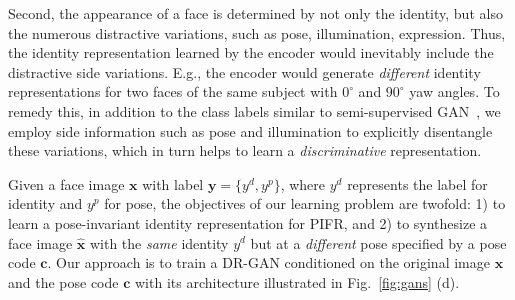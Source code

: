 \documentclass[10pt,journal,compsoc]{IEEEtran}
\begin{document}
Second, the appearance of a face is determined by not only the identity, but also the numerous distractive variations, such as pose, illumination, expression.
Thus, the identity representation learned by the encoder would inevitably include the distractive side variations.
E.g., the encoder would generate {\it different} identity representations for two faces of the same subject with $0^{\circ}$ and $90^{\circ}$ yaw angles.
To remedy this, in addition to the class labels similar to semi-supervised GAN~\cite{salimans2016improved}, we employ side information such as pose and illumination to explicitly disentangle these variations, which in turn helps to learn a {\it discriminative} representation.

Given a face image $\mathbf{x}$ with label $\mathbf{y} = \{ y^{d}, y^{p}\}$, where $y^d$ represents the label for identity and $y^p$ for pose, the objectives of our learning problem are twofold: 1) to learn a pose-invariant identity representation for PIFR, and 2) to synthesize a face image $\hat{\mathbf{x}}$ with the {\it same} identity $y^{d}$ but at a {\it different} pose specified by a pose code $\mathbf{c}$. 
Our approach is to train a DR-GAN conditioned on the original image $\mathbf{x}$ and the pose code $\mathbf{c}$ with its architecture illustrated in Fig.~\ref{fig:gans} (d).
\end{document}
